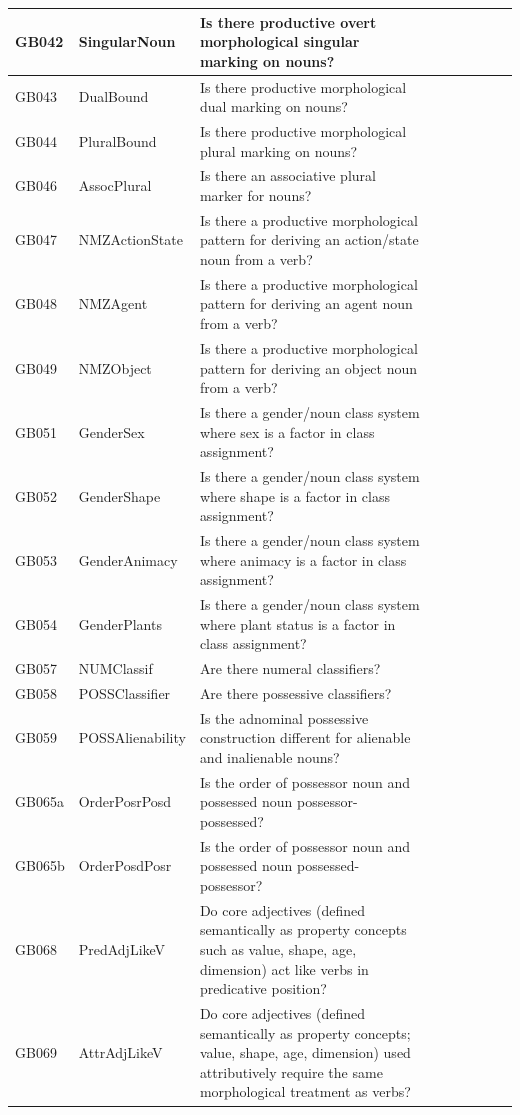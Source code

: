 \documentclass[a4paper,10pt]{article} %
\begin{document}
\begin{landscape}
\begin{longtable}{| l | p{4cm}| p{12cm}|p{2cm}|p{2cm}|p{2cm}|p{2cm}|p{2cm}|p{2cm}|}
GB042 & SingularNoun&Is there productive overt morphological singular marking on nouns?\\ \hline
GB043 & DualBound&Is there productive morphological dual marking on nouns?\\ \hline
GB044 & PluralBound&Is there productive morphological plural marking on nouns?\\ \hline
GB046 & AssocPlural&Is there an associative plural marker for nouns?\\ \hline
GB047 & NMZActionState&Is there a productive morphological pattern for deriving an action/state noun from a verb?\\ \hline
GB048 & NMZAgent&Is there a productive morphological pattern for deriving an agent noun from a verb?\\ \hline
GB049 & NMZObject&Is there a productive morphological pattern for deriving an object noun from a verb?\\ \hline
GB051 & GenderSex&Is there a gender/noun class system where sex is a factor in class assignment?\\ \hline
GB052 & GenderShape&Is there a gender/noun class system where shape is a factor in class assignment?\\ \hline
GB053 & GenderAnimacy&Is there a gender/noun class system where animacy is a factor in class assignment?\\ \hline
GB054 & GenderPlants&Is there a gender/noun class system where plant status is a factor in class assignment?\\ \hline
GB057 & NUMClassif&Are there numeral classifiers?\\ \hline
GB058 & POSSClassifier&Are there possessive classifiers?\\ \hline
GB059 & POSSAlienability&Is the adnominal possessive construction different for alienable and inalienable nouns?\\ \hline
GB065a & OrderPosrPosd&Is the order of possessor noun and possessed noun possessor-possessed?\\ \hline
GB065b & OrderPosdPosr&Is the order of possessor noun and possessed noun possessed-possessor?\\ \hline
GB068 & PredAdjLikeV&Do core adjectives (defined semantically as property concepts such as value, shape, age, dimension) act like verbs in predicative position?\\ \hline
GB069 & AttrAdjLikeV&Do core adjectives (defined semantically as property concepts; value, shape, age, dimension) used attributively require the same morphological treatment as verbs?\\ \hline

\end{longtable}
\end{landscape}
\end{document}
